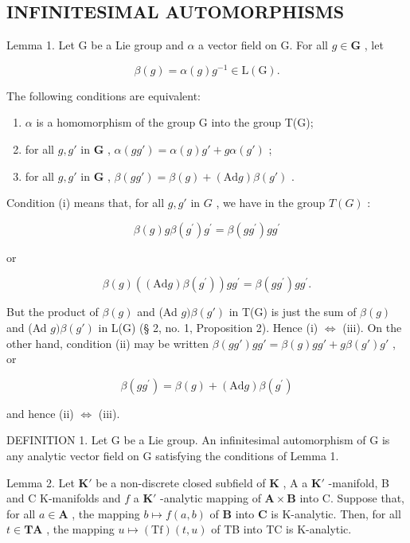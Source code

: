 \subsection{INFINITESIMAL AUTOMORPHISMS}

Lemma 1. Let G be a Lie group and \(\alpha\) a vector field on G. For all \(g \in \mathbf{G}\) , let

\[
\beta (g) = \alpha (g) g ^ {- 1} \in \mathrm{L} (\mathrm{G}).
\]

The following conditions are equivalent:

\begin{enumerate}
\def\labelenumi{(\roman{enumi})}
\item
  \(\alpha\) is a homomorphism of the group G into the group T(G);
\item
  for all \(g, g'\) in \(\mathbf{G}\) , \(\alpha(gg') = \alpha(g)g' + g\alpha(g')\) ;
\item
  for all \(g, g'\) in \(\mathbf{G}\) , \(\beta(gg') = \beta(g) + (\mathrm{Ad}g)\beta(g')\) .
\end{enumerate}

Condition (i) means that, for all \(g, g'\) in \(G\) , we have in the group \(T(G)\) :

\[
\beta (g) g \beta (g ^ {\prime}) g ^ {\prime} = \beta (g g ^ {\prime}) g g ^ {\prime}
\]

or

\[
\beta (g) ((\mathrm{Ad} g) \beta (g ^ {\prime})) g g ^ {\prime} = \beta (g g ^ {\prime}) g g ^ {\prime}.
\]

But the product of \(\beta(g)\) and (Ad \(g)\beta(g')\) in T(G) is just the sum of \(\beta(g)\) and (Ad \(g)\beta(g')\) in L(G) (§ 2, no. 1, Proposition 2). Hence (i) \(\Leftrightarrow\) (iii). On the other hand, condition (ii) may be written \(\beta(gg')gg' = \beta(g)gg' + g\beta(g')g'\) , or

\[
\beta (g g ^ {\prime}) = \beta (g) + (\mathrm{Ad} g) \beta (g ^ {\prime})
\]

and hence (ii) \(\Leftrightarrow\) (iii).

DEFINITION 1. Let G be a Lie group. An infinitesimal automorphism of G is any analytic vector field on G satisfying the conditions of Lemma 1.

Lemma 2. Let \(\mathbf{K}'\) be a non-discrete closed subfield of \(\mathbf{K}\) , A a \(\mathbf{K}'\) -manifold, B and C K-manifolds and \(f\) a \(\mathbf{K}'\) -analytic mapping of \(\mathbf{A} \times \mathbf{B}\) into C. Suppose that, for all \(a \in \mathbf{A}\) , the mapping \(b \mapsto f(a, b)\) of \(\mathbf{B}\) into \(\mathbf{C}\) is K-analytic. Then, for all \(t \in \mathbf{TA}\) , the mapping \(u \mapsto (\mathrm{Tf})(t, u)\) of TB into TC is K-analytic.

